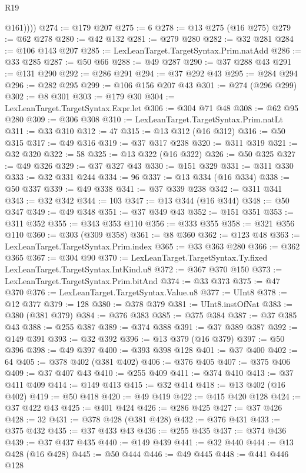 \begin{lexlean}{R19}
\begin{coremodule}
            @161))))
@274 := @179 @207
@275 := 6
@278 := @13 @275 (@16 @275)
@279 := @62 @278
@280 := @42 @132
@281 := @279 @280
@282 := @32 @281
@284 := @106 @143 @207
@285 := LexLeanTarget.TargetSyntax.Prim.natAdd
@286 := @33 @285
@287 := @50 @66
@288 := @49 @287
@290 := @37 @288 @43
@291 := @131 @290
@292 := @286 @291
@294 := @37 @292 @43
@295 := @284 @294
@296 := @282 @295
@299 := @106 @156 @207 @43
@301 := @274 (@296 @299)
@302 := @8 @301
@303 := @179 @30
@304 := LexLeanTarget.TargetSyntax.Expr.let
@306 := @304 @71 @48
@308 := @62 @95 @280
@309 := @306 @308
@310 := LexLeanTarget.TargetSyntax.Prim.natLt
@311 := @33 @310
@312 := 47
@315 := @13 @312 (@16 @312)
@316 := @50 @315
@317 := @49 @316
@319 := @37 @317 @238
@320 := @311 @319
@321 := @32 @320
@322 := 58
@325 := @13 @322 (@16 @322)
@326 := @50 @325
@327 := @49 @326
@329 := @37 @327 @43
@330 := @151 @329
@331 := @311 @330
@333 := @32 @331 @244
@334 := 96
@337 := @13 @334 (@16 @334)
@338 := @50 @337
@339 := @49 @338
@341 := @37 @339 @238
@342 := @311 @341
@343 := @32 @342
@344 := 103
@347 := @13 @344 (@16 @344)
@348 := @50 @347
@349 := @49 @348
@351 := @37 @349 @43
@352 := @151 @351
@353 := @311 @352
@355 := @343 @353 @110
@356 := @333 @355
@358 := @321 @356 @110
@360 := @303 (@309 @358)
@361 := @8 @360
@362 := @123 @48
@363 := LexLeanTarget.TargetSyntax.Prim.index
@365 := @33 @363 @280
@366 := @362 @365
@367 := @304 @90
@370 := LexLeanTarget.TargetSyntax.Ty.fixed LexLeanTarget.TargetSyntax.IntKind.u8
@372 := @367 @370 @150
@373 := LexLeanTarget.TargetSyntax.Prim.bitAnd
@374 := @33 @373
@375 := @47 @370
@376 := LexLeanTarget.TargetSyntax.Value.u8
@377 := UInt8
@378 := @12 @377
@379 := 128
@380 := @378 @379
@381 := UInt8.instOfNat
@383 := @380 (@381 @379)
@384 := @376 @383
@385 := @375 @384
@387 := @37 @385 @43
@388 := @255 @387
@389 := @374 @388
@391 := @37 @389 @387
@392 := @149 @391
@393 := @32 @392
@396 := @13 @379 (@16 @379)
@397 := @50 @396
@398 := @49 @397
@400 := @393 @398 @128
@401 := @37 @400
@402 := 64
@405 := @378 @402 (@381 @402)
@406 := @376 @405
@407 := @375 @406
@409 := @37 @407 @43
@410 := @255 @409
@411 := @374 @410
@413 := @37 @411 @409
@414 := @149 @413
@415 := @32 @414
@418 := @13 @402 (@16 @402)
@419 := @50 @418
@420 := @49 @419
@422 := @415 @420 @128
@424 := @37 @422 @43
@425 := @401 @424
@426 := @286 @425
@427 := @37 @426
@428 := 32
@431 := @378 @428 (@381 @428)
@432 := @376 @431
@433 := @375 @432
@435 := @37 @433 @43
@436 := @255 @435
@437 := @374 @436
@439 := @37 @437 @435
@440 := @149 @439
@441 := @32 @440
@444 := @13 @428 (@16 @428)
@445 := @50 @444
@446 := @49 @445
@448 := @441 @446 @128

\end{coremodule}
\end{lexlean}
